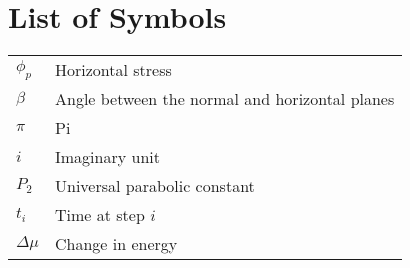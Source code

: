 \chapter*{List of Symbols} \label{symbols}

\hspace*{-0.6in}
\begin{tabular}{@{}C{1in} L{5.25in}}
$\phi_p$ & Horizontal stress \\
$\beta$ & Angle between the normal and horizontal planes \\
$\pi$ & Pi \\
$i$ & Imaginary unit \\
$P_2$ & Universal parabolic constant \\
$t_i$ & Time at step $i$ \\
$\Delta\mu$ & Change in energy \\
\end{tabular}

